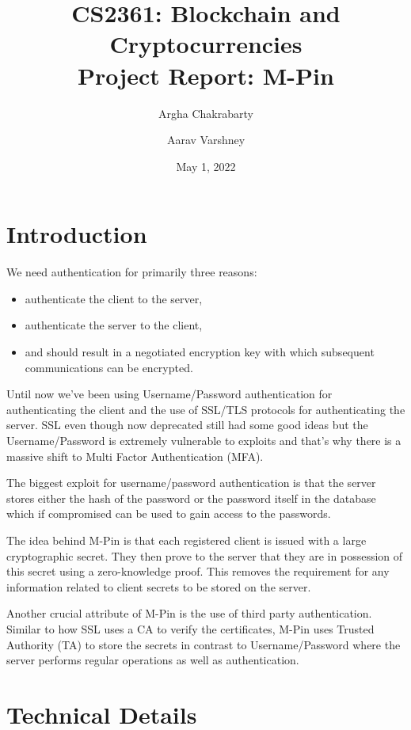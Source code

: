 \documentclass[]{article}   %
\begin{document}
\title{CS2361: Blockchain and Cryptocurrencies\\ Project Report: M-Pin}   %
\author{Argha Chakrabarty \and Aarav Varshney}         %
\date{May 1, 2022}    %
\maketitle

\section*{Introduction}
We need authentication for primarily three reasons:
\begin{itemize}
    \itemsep0em
    \item authenticate the client to the server,
    \item authenticate the server to the client,
    \item and should result in a negotiated encryption key with which subsequent communications can be encrypted.
\end{itemize}
Until now we've been using Username/Password authentication for authenticating the client and the use of SSL/TLS protocols for authenticating the server. SSL even though now deprecated still had some good ideas but the Username/Password is extremely vulnerable to exploits and that's why there is a massive shift to Multi Factor Authentication (MFA).

The biggest exploit for username/password authentication is that the server stores either the hash of the password or the password itself in the database which if compromised can be used to gain access to the passwords.

The idea behind M-Pin is that each registered client is issued with a large cryptographic secret. They then prove to the server that they are in possession of this secret using a zero-knowledge proof. This removes the requirement for any information related to client secrets to be stored on the server.

Another crucial attribute of M-Pin is the use of third party authentication. Similar to how SSL uses a CA to verify the certificates, M-Pin uses Trusted Authority (TA) to store the secrets in contrast to Username/Password where the server performs regular operations as well as authentication.

\newpage
\section*{Technical Details}
\end{document}
